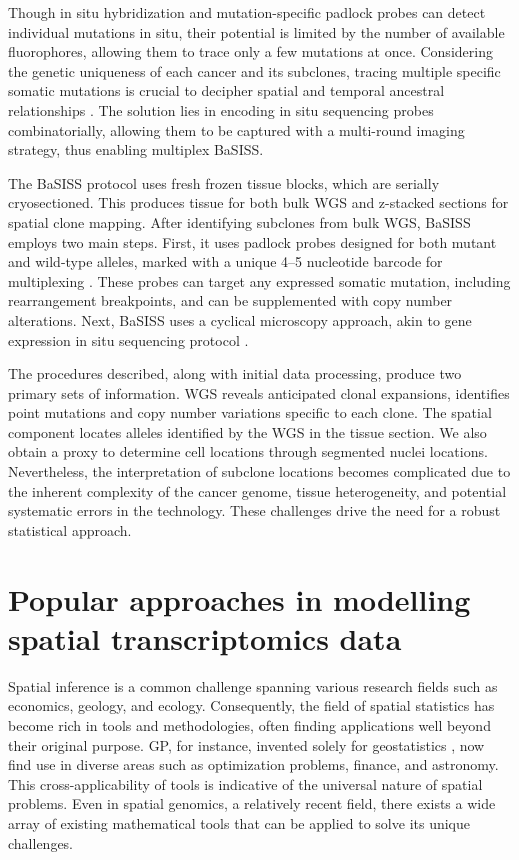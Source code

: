 Though in situ hybridization \parencite{Janiszewska2015-kb} and mutation-specific padlock probes \parencite{Larsson2010-bp,Grundberg2013-te,Ke2013-km,Baker2017-jz} can detect individual mutations in situ, their potential is limited by the number of available fluorophores, allowing them to trace only a few mutations at once. Considering the genetic uniqueness of each cancer and its subclones, tracing multiple specific somatic mutations is crucial to decipher spatial and temporal ancestral relationships \parencite{Nik-Zainal2012-tt}. The solution lies in encoding in situ sequencing probes combinatorially, allowing them to be captured with a multi-round imaging strategy, thus enabling multiplex \acf{BaSISS}.

The \ac{BaSISS} protocol uses fresh frozen tissue blocks, which are serially cryosectioned. This produces tissue for both bulk \ac{WGS} and z-stacked sections for spatial clone mapping. After identifying subclones from bulk WGS, \ac{BaSISS} employs two main steps. First, it uses padlock probes designed for both mutant and wild-type alleles, marked with a unique 4–5 nucleotide barcode for multiplexing \parencite{Ke2013-km}. These probes can target any expressed somatic mutation, including rearrangement breakpoints, and can be supplemented with copy number alterations. Next, \ac{BaSISS}  uses a cyclical microscopy approach, akin to gene expression in situ sequencing protocol \parencite{Ke2013-km,Svedlund2019-xb}.

The procedures described, along with initial data processing, produce two primary sets of information. \ac{WGS} reveals anticipated clonal expansions, identifies point mutations and copy number variations specific to each clone. The spatial component locates alleles identified by the \ac{WGS} in the tissue section. We also obtain a proxy to determine cell locations through segmented nuclei locations. Nevertheless, the interpretation of subclone locations becomes complicated due to the inherent complexity of the cancer genome, tissue heterogeneity, and potential systematic errors in the technology. These challenges drive the need for a robust statistical approach.

\section{Popular approaches in modelling spatial transcriptomics data}
\label{sec:basiss-popular}
Spatial inference is a common challenge spanning various research fields such as economics, geology, and ecology. Consequently, the field of spatial statistics has become rich in tools and methodologies, often finding applications well beyond their original purpose. \acl{GP}, for instance, invented solely for geostatistics \parencite{Krige1951-mt}, now find use in diverse areas such as optimization problems, finance, and astronomy. This cross-applicability of tools is indicative of the universal nature of spatial problems. Even in spatial genomics, a relatively recent field, there exists a wide array of existing mathematical tools that can be applied to solve its unique challenges.
    
